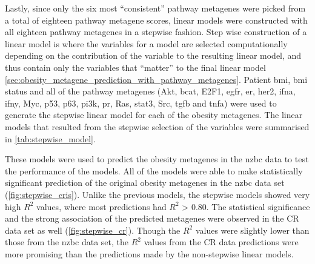 Lastly, since only the six most ``consistent'' pathway metagenes were picked from a total of eighteen pathway metagene scores, linear models were constructed with all eighteen pathway metagenes in a stepwise fashion.
Step wise construction of a linear model is where the variables for a model are selected computationally depending on the contribution of the variable to the resulting linear model, and thus contain only the variables that ``matter'' to the final linear model \cref{sec:obesity_metagene_prediction_with_pathway_metagenes}.
Patient \gls{bmi}, \gls{bmi} status and all of the pathway metagenes (Akt, \gls{bcat}, E2F1, \gls{egfr}, \gls{er}, \gls{her2}, \gls{ifna}, \gls{ifny}, Myc, p53, p63, \gls{pi3k}, \gls{pr}, Ras, \gls{stat3}, Src, \gls{tgfb} and \gls{tnfa}) were used to generate the stepwise linear model for each of the obesity metagenes.
The linear models that resulted from the stepwise selection of the variables were summarised in \cref{tab:stepwise_model}.

These models were used to predict the obesity metagenes in the \gls{nzbc} data to test the performance of the models.
All of the models were able to make statistically significant prediction of the original obesity metagenes in the \gls{nzbc} data set (\cref{fig:stepwise_cris}).
Unlike the previous models, the stepwise models showed very high $R^2$ values, where most predictions had $R^2$ \textgreater{} 0.80.
The statistical significance and the strong association of the predicted metagenes were observed in the CR data set as well (\cref{fig:stepwise_cr}).
Though the $R^2$ values were slightly lower than those from the \gls{nzbc} data set, the $R^2$ values from the CR data predictions were more promising than the predictions made by the non-stepwise linear models.

